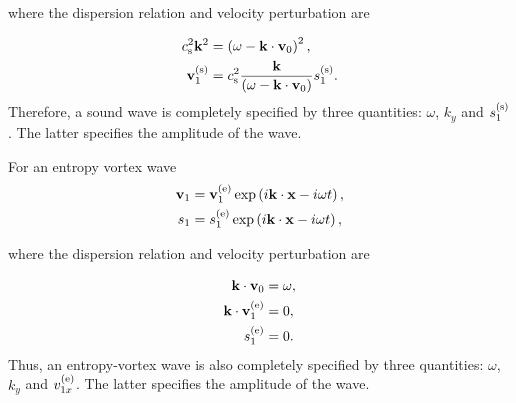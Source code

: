\documentclass[useAMS,usenatbib]{mn2e}
\begin{document}
where the dispersion relation and velocity perturbation are

\begin{align}
 c_{\rm s}^2 \mathbf{k}^2  & =  \left( \omega - \mathbf{k} \cdot \mathbf{v}_0 \right)^2,  \label{eq:sound3} \\
\mathbf{v}_1 ^{(\rm s)} & = c_{\rm s}^2 \frac{\mathbf{k}}{ ( \omega - \mathbf{k}\cdot \mathbf{v}_0 )} s_1 ^{(\rm s)}. \label{eq:sound4} 
\end{align}
Therefore, a sound wave is completely specified by three quantities: $\omega$, $k_y$ and $ s_1 ^{(\rm s)}$. The latter specifies the amplitude of the wave.

For an entropy vortex wave
%
\begin{align}
\mathbf{v}_1& = \mathbf{v}_1 ^{(\rm e)} \exp\left( i \mathbf{k} \cdot \mathbf{x} - i \omega t \right), \label{eq:ex1} \\
s_1    &= s_1 ^{(\rm e)} \exp\left( i \mathbf{k} \cdot \mathbf{x} - i \omega t \right), \label{eq:ex2}
\end{align}

where the dispersion relation and velocity perturbation are

\begin{align}
\mathbf{k} \cdot \mathbf{v}_0 & = \omega, \label{eq:ex3} \\
\mathbf{k} \cdot  \mathbf{v}_1 ^{(\rm e)}  & = 0, \label{eq:ex4} \\
 s_1 ^{(\rm e)} & = 0. \label{eq:ex5}
\end{align}
%
Thus, an entropy-vortex wave is also completely specified by three quantities: $\omega$, $k_y$ and $ v_{1x} ^{(\rm e)}$. The latter specifies the amplitude of the wave.
\end{document}
